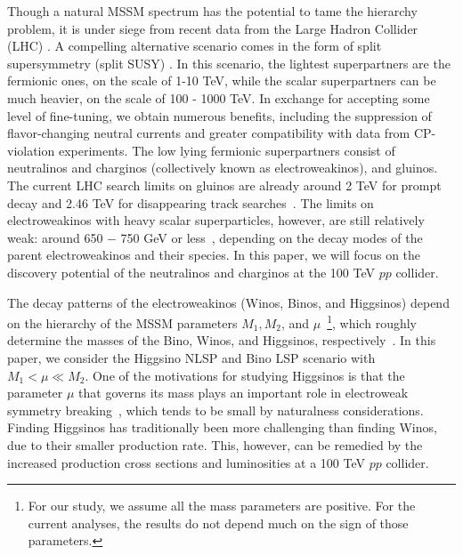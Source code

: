 \documentclass[a4paper,11pt]{article}
\begin{document}
Though a natural MSSM spectrum has the potential to tame the hierarchy
problem, it is under siege from recent data from the Large Hadron
Collider (LHC) \cite{Aaboud:2018ujj, Sirunyan:2018vjp}. 
A compelling alternative scenario comes in the form of
split supersymmetry (split SUSY) \cite{Wells:2003tf,
ArkaniHamed:2004yi, Giudice:2004tc}. In this scenario, the lightest
superpartners are the fermionic ones, on the
scale of 1-10 TeV, while the scalar superpartners can be much heavier,
on the scale of 100 - 1000 TeV. In exchange for accepting some level of
fine-tuning, we obtain numerous benefits, including the suppression of
flavor-changing neutral currents and greater compatibility with data
from CP-violation experiments.  The low lying 
fermionic superpartners consist of neutralinos and charginos (collectively
known as electroweakinos), and gluinos. The current LHC search limits on
gluinos are already around 2 TeV for prompt decay and 2.46 TeV for disappearing track searches~\cite{CMS-PAS-SUS-19-005}.   The
limits on electroweakinos with heavy scalar superparticles,
however, are still relatively weak: around 650 $-$ 750 GeV or  less~\cite{ATL-PHYS-PUB-2019-022, Sirunyan:2017lae,Aaboud:2018htj,Sirunyan:2018ubx,Aaboud:2018zeb}, depending on
the decay modes of the parent electroweakinos and their species.  In this paper, we will
focus on the discovery potential of the neutralinos and charginos at the 100
TeV $pp$ collider. 

The decay patterns of the electroweakinos (Winos, Binos, and Higgsinos)
depend on the hierarchy of the MSSM parameters $M_1, M_2$, and $\mu$~\footnote{For our study, we assume all the mass parameters are positive.  For the current analyses, the results do not depend much on the sign of those parameters.}, which 
roughly determine the masses of the Bino, Winos, and Higgsinos, respectively~\cite{Han:2013kza}. 
In this paper, we consider the Higgsino NLSP and Bino LSP scenario with $M_1 < \mu \ll M_2$.
One of the motivations for studying Higgsinos is that the parameter $\mu$ 
that governs its mass plays an important role in electroweak symmetry breaking~\cite{Acharya:2014pua}, which tends to be small by naturalness considerations.   Finding Higgsinos has traditionally been more challenging 
than finding Winos, due to their smaller production rate. This, however, can 
be remedied by the increased  production cross sections and luminosities 
at a 100 TeV $pp$ collider.
\end{document}
